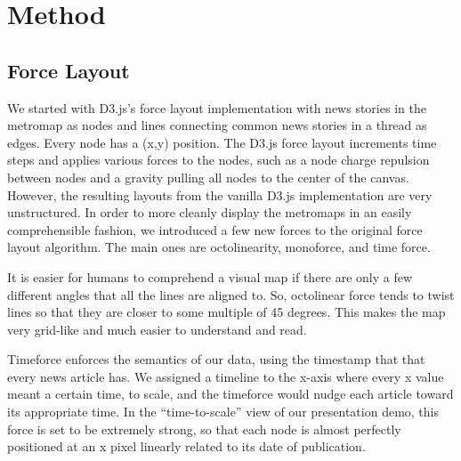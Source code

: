 \documentclass{chi2009}
\begin{document}
\section{Method}

\subsection{Force Layout}
We started with D3.js’s force layout implementation with news stories in the metromap as nodes and lines connecting common news stories in a thread as edges.  Every node has a (x,y) position.  The D3.js force layout increments time steps and applies various forces to the nodes, such as a node charge repulsion between nodes and a gravity pulling all nodes to the center of the canvas.  However, the resulting layouts from the vanilla D3.js implementation are very unstructured.  In order to more cleanly display the metromaps in an easily comprehensible fashion, we introduced a few new forces to the original force layout algorithm.  The main ones are octolinearity, monoforce, and time force.  

It is easier for humans to comprehend a visual map if there are only a few different angles that all the lines are aligned to.  So, octolinear force tends to twist lines so that they are closer to some multiple of 45 degrees.  This makes the map very grid-like and much easier to understand and read.  

Timeforce enforces the semantics of our data, using the timestamp that that every news article has.  We assigned a timeline to the x-axis where every x value meant a certain time, to scale, and the timeforce would nudge each article toward its appropriate time. In the “time-to-scale” view of our presentation demo, this force is set to be extremely strong, so that each node is almost perfectly positioned at an x pixel linearly related to its date of publication.
\end{document}
